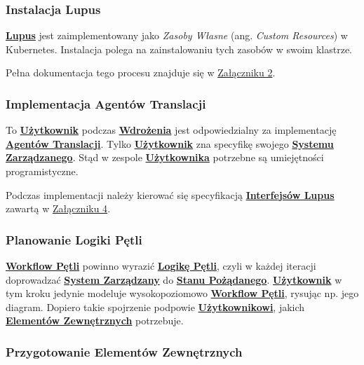 \subsubsection{Instalacja Lupus}

\hyperlink{def:lupus}{\textbf{Lupus}} jest zaimplementowany jako \textit{Zasoby Własne} (ang. \textit{Custom Resources}) w Kubernetes. Instalacja polega na zainstalowaniu tych zasobów w swoim klastrze. 

Pełna dokumentacja tego procesu znajduje się w \hyperref[appendix:2]{Załączniku 2}.

\subsubsection{Implementacja Agentów Translacji}

To \hyperlink{def:uzytkownik}{\textbf{Użytkownik}} podczas \hyperlink{def:wdrozenie-lupus}{\textbf{Wdrożenia}} jest odpowiedzialny za implementację \hyperlink{def:agent-translacji}{\textbf{Agentów Translacji}}. Tylko \hyperlink{def:uzytkownik}{\textbf{Użytkownik}} zna specyfikę swojego \hyperlink{def:system-zarzadzany}{\textbf{Systemu Zarządzanego}}. Stąd w zespole \hyperlink{def:uzytkownik}{\textbf{Użytkownika}} potrzebne są umiejętności programistyczne. 

Podczas implementacji należy kierować się specyfikacją \hyperlink{def:interfejsy-lupus}{\textbf{Interfejsów Lupus}} zawartą w \hyperref[appendix:4]{Załączniku 4}.

\subsubsection{Planowanie Logiki Pętli}

\hyperlink{def:workflow-petli}{\textbf{Workflow Pętli}} powinno wyrazić \hyperlink{def:logika-petli}{\textbf{Logikę Pętli}}, czyli w każdej iteracji doprowadzać \hyperlink{def:system-zarzadzany}{\textbf{System Zarządzany}} do \hyperlink{def:stan-pozadany}{\textbf{Stanu Pożądanego}}. \hyperlink{def:uzytkownik}{\textbf{Użytkownik}} w tym kroku jedynie modeluje wysokopoziomowo \hyperlink{def:workflow-petli}{\textbf{Workflow Pętli}}, rysując np. jego diagram. Dopiero takie spojrzenie podpowie \hyperlink{def:uzytkownik}{\textbf{Użytkownikowi}}, jakich \hyperlink{def:element-zewnetrzny}{\textbf{Elementów Zewnętrznych}} potrzebuje.

\subsubsection{Przygotowanie Elementów Zewnętrznych}

